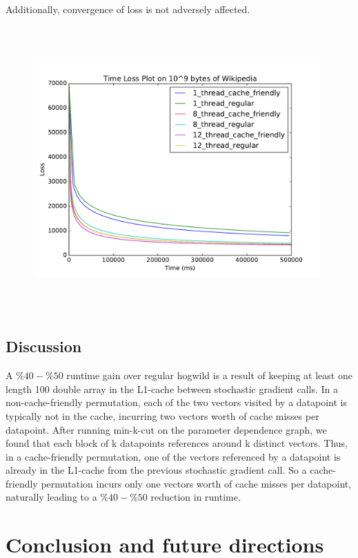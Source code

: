 \documentclass[times,11pt]{article}
\numberwithin{equation}{section}		%
\numberwithin{figure}{section}			%
\numberwithin{table}{section}				%
\begin{document}
\noindent Additionally, convergence of loss is not adversely affected.
\begin{figure}[H]
\begin{center}
\includegraphics[width=11cm,height=11cm,keepaspectratio]{w2v_time_loss_plot.pdf}
\end{center}
\end{figure}

\subsection{Discussion}

A $\%40-\%50$ runtime gain over regular hogwild is a result of keeping
at least one length 100 double array in the L1-cache between
stochastic gradient calls. In a non-cache-friendly permutation, each
of the two vectors visited by a datapoint is typically not in the
cache, incurring two vectors worth of cache misses per
datapoint. After running min-k-cut on the parameter dependence graph,
we found that each block of k datapoints references around k distinct
vectors. Thus, in a cache-friendly permutation, one of the vectors
referenced by a datapoint is already in the L1-cache from the previous
stochastic gradient call. So a cache-friendly permutation incurs only
one vectors worth of cache misses per datapoint, naturally leading to
a $\%40-\%50$ reduction in runtime.
\newpage

\section{Conclusion and future directions}\label{sec:conc}
\end{document}
